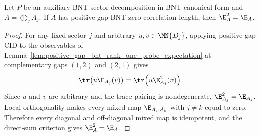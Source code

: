 \begin{lemma}%
    \label{thm:positive_gap_bnt_zcl_unconditional_converse}
    \leanok
    Let $P$ be an auxiliary BNT sector decomposition in BNT canonical form and
    $A=\bigoplus_j A_j$. If $A$ has
    positive-gap BNT zero correlation length, then $\E_A^2=\E_A$.
\end{lemma}
\begin{proof}\leanok
    For any fixed sector $j$ and arbitrary $u,v\in\MN{D_j}$, applying
    positive-gap CID to the observables of
    Lemma~\ref{lem:positive_gap_bnt_rank_one_probe_expectation} at
    complementary gaps $(1,2)$ and $(2,1)$ gives
    \begin{align}
        \tr\!\left(u\E_{A_j}(v)\right)
        =\tr\!\left(u\E_{A_j}^2(v)\right).
        \notag
    \end{align}
    Since $u$ and $v$ are arbitrary and the trace pairing is nondegenerate,
    $\E_{A_j}^2=\E_{A_j}$. Local orthogonality makes every mixed map
    $\E_{A_j,A_k}$ with $j\ne k$ equal to zero. Therefore every diagonal and
    off-diagonal mixed map is idempotent, and the direct-sum criterion gives
    $\E_A^2=\E_A$.
\end{proof}

